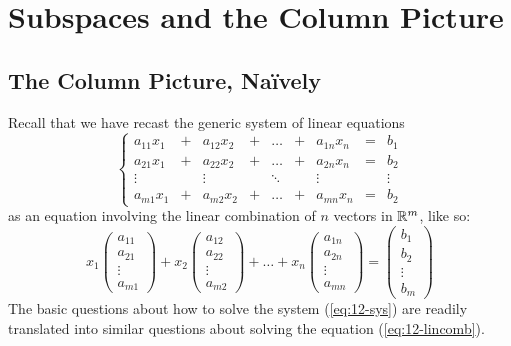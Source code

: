 \documentclass[elementsmain.tex]{subfiles}
\begin{document}
\section{Subspaces and the Column Picture}


\subsection*{The Column Picture, Na\"{i}vely}

Recall that we have recast the generic system of linear equations
\begin{equation}\label{eq:12-sys}
\left\{
\begin{array}{ccccccccc}
a_{11} x_1 & + & a_{12} x_2 & + & \dots & + & a_{1n} x_n & = & b_1 \\
a_{21} x_1 & + & a_{22} x_2 & + & \dots & + & a_{2n} x_n & = & b_2 \\
\vdots     &   & \vdots     &   & \ddots &  & \vdots     &  & \vdots \\ 
a_{m1} x_1 & + & a_{m2} x_2 & + & \dots & + & a_{mn} x_n & = & b_2 
\end{array}\right.
\end{equation}
as an equation involving the linear combination of $n$ vectors in $\mathbb{R}^m$, like so:
\begin{equation}\label{eq:12-lincomb}
x_1\begin{pmatrix} a_{11}\\ a_{21} \\ \vdots \\ a_{m1}\end{pmatrix} +
x_2\begin{pmatrix} a_{12}\\ a_{22} \\ \vdots \\ a_{m2}\end{pmatrix} +
\dots +
x_n\begin{pmatrix} a_{1n}\\ a_{2n} \\ \vdots \\ a_{mn}\end{pmatrix} =
\begin{pmatrix} b_1\\ b_2 \\ \vdots \\ b_m\end{pmatrix}
\end{equation}
The basic questions about how to solve the system (\ref{eq:12-sys}) are readily translated into similar questions about solving the equation (\ref{eq:12-lincomb}). 
\end{document}
